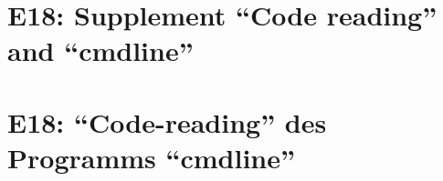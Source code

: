 
\thispagestyle{empty}
\ifenglish
\section*{E18: Supplement ``Code reading'' and ``cmdline''}

\fi
\ifgerman
\section*{E18: "`Code-reading"' des Programms "`cmdline"'}

\fi


